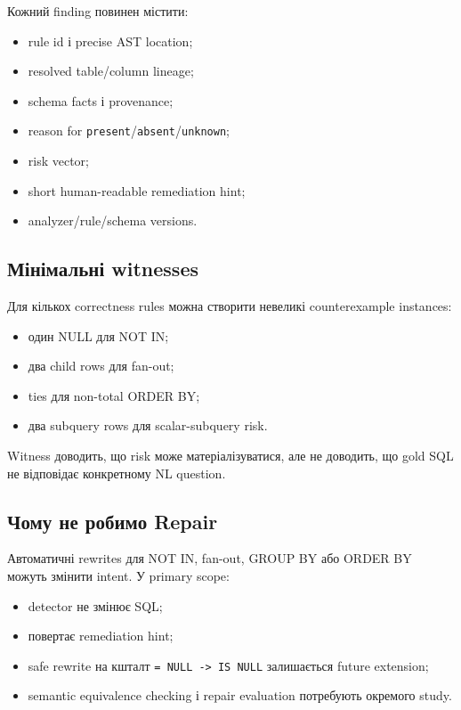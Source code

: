 \documentclass[11pt,a4paper]{article}
\newcommand{\unknown}{\texttt{unknown}}
\newcommand{\presentstate}{\texttt{present}}
\newcommand{\absentstate}{\texttt{absent}}
\begin{document}
Кожний finding повинен містити:

\begin{itemize}
\item rule id і precise AST location;
\item resolved table/column lineage;
\item schema facts і provenance;
\item reason for \presentstate/\absentstate/\unknown;
\item risk vector;
\item short human-readable remediation hint;
\item analyzer/rule/schema versions.
\end{itemize}

\subsection{Мінімальні witnesses}

Для кількох correctness rules можна створити невеликі counterexample instances:

\begin{itemize}
\item один NULL для NOT IN;
\item два child rows для fan-out;
\item ties для non-total ORDER BY;
\item два subquery rows для scalar-subquery risk.
\end{itemize}

Witness доводить, що risk може матеріалізуватися, але не доводить, що gold SQL не
відповідає конкретному NL question.

\subsection{Чому не робимо Repair}

Автоматичні rewrites для NOT IN, fan-out, GROUP BY або ORDER BY можуть змінити intent.
У primary scope:

\begin{itemize}
\item detector не змінює SQL;
\item повертає remediation hint;
\item safe rewrite на кшталт \texttt{= NULL -> IS NULL} залишається future extension;
\item semantic equivalence checking і repair evaluation потребують окремого study.
\end{itemize}
\end{document}
